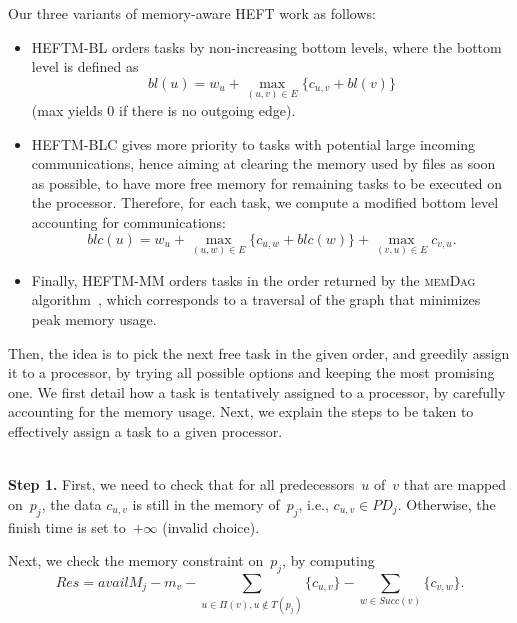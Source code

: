 \documentclass[conference]{IEEEtran}
\newcommand{\algo}[1]{\textsc{#1}}
\newcommand{\skug}[1]{{\color{blue}[SK: #1]}}
\begin{document}
Our three variants of memory-aware HEFT work as follows:
\begin{itemize}
\item    
  HEFTM-BL orders tasks by non-increasing bottom levels, where the bottom
  level is defined as
  $$bl(u) = w_u + \max_{(u,v)\in E} \{c_{u,v} + bl(v)\}$$
  (max yields $0$ if there is no outgoing edge).

\item    
  HEFTM-BLC %
  gives more priority to tasks with potential large incoming communications,
  hence aiming at clearing the memory used by files as soon as possible,
  to have more free memory for remaining tasks to be executed on the processor.
  Therefore, for each task, we compute a modified bottom level accounting for communications:
  $$blc(u) = w_u + \max_{(u,w)\in E} \{c_{u,w} + blc(w)\} + \max_{(v,u)\in E} c_{v,u}   . $$


\item   
  Finally, HEFTM-MM orders tasks  in the order returned by %
  the  \algo{memDag} algorithm~\cite{KAYAASLAN20181}, which corresponds to a traversal
  of the graph that minimizes peak memory usage.
\end{itemize}


\smallskip
{}

Then, the idea is to pick the next free task in the given order,
and greedily assign it to a processor, by trying all possible options
and keeping the most promising one. We first detail how a task
is tentatively assigned to a processor, by carefully accounting for the memory usage.
Next, we explain the steps to be taken to effectively assign a task to a given processor.

\medskip
{}\\
{\bf Step 1.} First, we need to check that for all predecessors~$u$ of~$v$ that are mapped
on~$p_j$, the data $c_{u,v}$ is still in the memory of~$p_j$,
i.e., $c_{u,v}\in PD_j$. Otherwise, the finish time is set to~$+\infty$ (invalid choice).

\smallskip
{} Next, we check the memory constraint on~$p_j$, by computing
$$Res = availM_j - m_v - \!\!\!\! \sum_{u \in \Pi(v), u\notin T(p_j)}  \!\!\!\!\!\!\!\!\{c_{u,v}\}
- \sum_{w\in Succ(v)} \!\!\!\!\!\! \{c_{v,w}\}.$$
\end{document}
